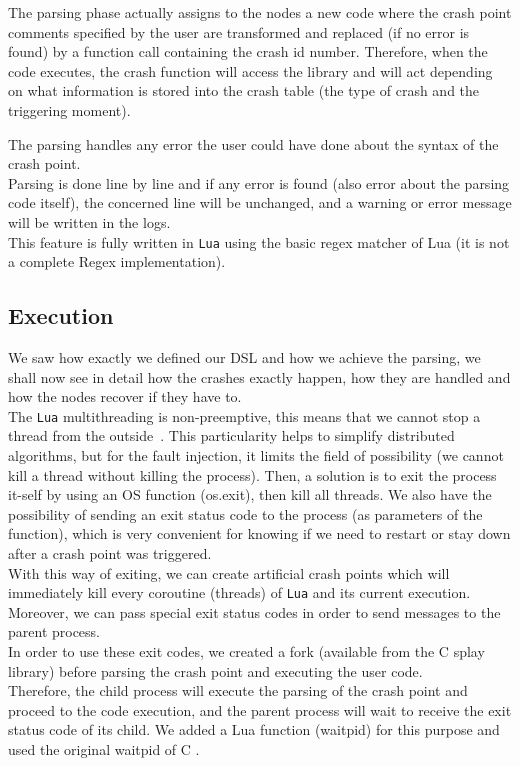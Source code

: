 \documentclass{eplmastersthesis}
\begin{document}
        The parsing phase actually assigns to the nodes a new code where the
        crash point comments specified by the user are transformed and
        replaced (if no error is found) by a function call containing the
        crash id number. Therefore, when the code executes, the crash
        function will access the library and will act depending on what
        information is stored into the crash table (the type of crash and
        the triggering moment).

        The parsing handles any error the user could have done about the
        syntax of the crash point.\\
        Parsing is done line by line and if any error is found (also error
        about the parsing code itself), the concerned line will be unchanged, and
        a warning or error message will be written in the logs.\\
        This feature is fully written in \texttt{Lua} using the basic regex matcher of Lua
        \cite{RegexLua} (it is not a complete Regex implementation).

      \subsection{Execution}

        We saw how exactly we defined our DSL and how we achieve the parsing,
        we shall now see in detail how the crashes exactly happen, how they
        are handled and how the nodes recover if they have to.\\

        The \texttt{Lua} multithreading is non-preemptive, this means that we cannot stop a thread from the
        outside~\cite{CoroutineLua}. This particularity helps to simplify distributed algorithms,
        but for the fault injection, it limits the field of possibility
        (we cannot kill a thread without killing the process).
        Then, a solution is to exit the process it-self by using an OS function (os.exit),
        then kill all threads. We also have the possibility of sending an exit
        status code to the process (as parameters of the function),
        which is very convenient for knowing if we need to restart or stay
        down after a crash point was triggered.\\

        With this way of exiting, we can create artificial crash points which
        will immediately kill every coroutine (threads) of \texttt{Lua} and its
        current execution. Moreover, we can pass special exit status codes
        in order to send messages to the parent process.\\
        In order to use these exit codes, we created a fork (available from
        the C splay library) before parsing the crash point and executing
        the user code.\\
        Therefore, the child process will execute the parsing of the crash
        point and proceed to the code execution, and the parent process will
        wait to receive the exit status code of its child. We added a Lua
        function (waitpid) for this purpose and used the original waitpid
        of C \cite{waitpid}.\\
\end{document}
